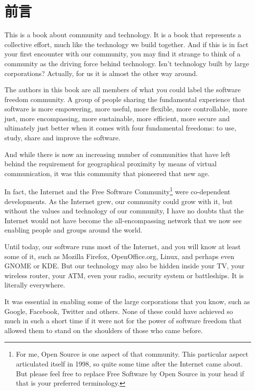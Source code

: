 \section*{前言}

This is a book about community and technology. It is a book that
represents a collective effort, much like the technology we build
together. And if this is in fact your first encounter with our
community, you may find it strange to think of a community as the
driving force behind technology. Isn't technology built by large
corporations? Actually, for us it is almost the other way around.

The authors in this book are all members of what you could label the
software freedom community. A group of people sharing the fundamental
experience that software is more empowering, more useful, more
flexible, more controllable, more just, more encompassing, more
sustainable, more efficient, more secure and ultimately just better
when it comes with four fundamental freedoms: to use, study, share and
improve the software.

And while there is now an increasing number of communities that have left
behind the requirement for geographical proximity by means of virtual
communication, it was this community that pioneered that new age. 

In fact, the Internet and the Free Software Community\footnote{For me,
  Open Source is one aspect of that community. This particular aspect
  articulated itself in 1998, so quite some time after the Internet
  came about. But please feel free to replace Free Software by Open
  Source in your head if that is your preferred terminology.}  were
co-dependent developments. As the Internet grew, our community could
grow with it, but without the values and technology of our community,
I have no doubts that the Internet would not have become the
all-encompassing network that we now see enabling people and groups
around the world.

Until today, our software runs most of the Internet, and you will know
at least some of it, such as Mozilla Firefox,
OpenOffice.org, Linux, and perhaps even GNOME or KDE. But our
technology may also be hidden inside your TV, your wireless
router, your ATM, even your radio, security system or battleships. It
is literally everywhere. 

It was essential in enabling some of the large corporations
that you know, such as Google, Facebook, Twitter and others. None of
these could have achieved so much in such a short time if it were not
for the power of software freedom that allowed them to stand on the
shoulders of those who came before.

